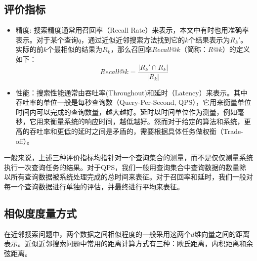 \subsection{评价指标}
\begin{itemize}
    \item 精度: 搜索精度通常用召回率（Recall Rate）来表示，本文中有时也用准确率表示。对于某个查询$q$，通过近似近邻搜索方法找到它的$k$个结果表示为$R_{k}'$。实际的前$k$个最相似的结果为$R_k$，那么召回率$Recall@k$（简称：$R@k$）的定义如下：
    \begin{equation}
    Recall@k = \frac{{\left| {R_{k}' \cap R_{k}} \right|}}{{\left| {R_{k}} \right|}} \label{eq:recall}
    \end{equation}
    
    \item 性能：搜索性能通常由吞吐率(Throughout)和延时（Latency）来表示。其中吞吐率的单位一般是每秒查询数（Query-Per-Second, QPS），它用来衡量单位时间内可以完成的查询数量，越大越好。延时以时间单位作为测量，例如毫秒，它用来衡量系统的响应时间，越低越好。然而对于给定的算法和系统，更高的吞吐率和更低的延时之间是矛盾的，需要根据具体任务做权衡（Trade-off）。
\end{itemize}

一般来说，上述三种评价指标均指针对一个查询集合的测量，而不是仅仅测量系统执行一次查询任务的结果。对于QPS，我们一般用查询集合中查询数据的数量除以所有查询数据被系统处理完成的总时间来表征。对于召回率和延时，我们一般对每一个查询数据进行单独的评估，并最终进行平均来表征。

\subsection{相似度度量方式}
在近邻搜索问题中，两个数据之间相似程度的一般采用这两个$d$维向量之间的距离表示。近似近邻搜索问题中常用的距离计算方式有三种：欧氏距离\cite{dokmanic2015euclidean}，内积距离\cite{critchley1988certain}和余弦距离\cite{zou2008shape, nguyen2010cosine}。


